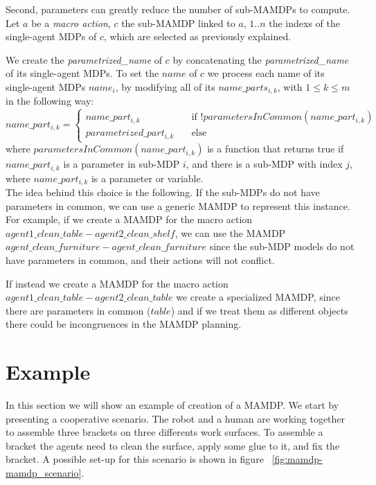 Second, parameters can greatly  reduce the number of sub-MAMDPs to compute. Let $a$ be a \textit{macro action}, $c$ the sub-MAMDP linked to $a$, $1..n$ the indexs of the single-agent MDPs of $c$, which are selected as previously explained.

 We create the \textit{parametrized\_name} of $c$ by concatenating the \textit{parametrized\_name} of its single-agent MDPs. To set the $name$ of  $c$ we process each name of its single-agent MDPs $name_i$, by modifying all of its $name\_parts_{i,k}$, with $1 \leq k \leq m$ in the following way:\\
$name\_part_{i,k}=
\begin{cases}
	name\_part_{i,k} & \quad \text{if } !parametersInCommon(name\_part_{i,k}) \\
	parametrized\_part_{i,k} & \quad \text{else}
\end{cases}$ \\
where $parametersInCommon(name\_part_{i,k})$ is a function that returns true if $name\_part_{i,k}$ is a parameter in sub-MDP $i$, and there is a sub-MDP with index $j$, where $name\_part_{i,k}$ is a parameter or variable. \\

The idea behind this choice is the following. If the sub-MDPs do not have parameters in common, we can use a generic MAMDP to represent this instance. For example, if we create a MAMDP for the macro action $agent1\_clean\_table-agent2\_clean\_shelf$, we can use the MAMDP $agent\_clean\_furniture-agent\_clean\_furniture$ since the sub-MDP models do not have parameters in common, and their actions will not conflict.

 If instead we create a MAMDP for the macro action $agent1\_clean\_table-agent2\_clean\_table$ we create a specialized MAMDP, since there are parameters in common ($table$) and if we treat them as different objects there could be incongruences in the MAMDP planning.



\section{Example}
\label{sec:mamdp-example}
In this section we will show an example of creation of a MAMDP. We start by presenting a cooperative scenario. The robot and a human are working together to assemble three brackets on three differents work surfaces. To assemble a bracket the agents need to clean the surface, apply some glue to it, and fix the bracket. A possible set-up for this scenario is shown in figure ~\ref{fig:mamdp-mamdp_scenario}.

